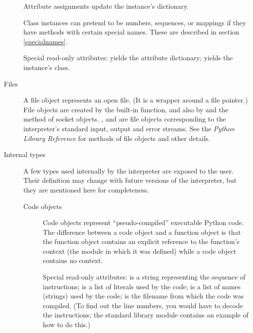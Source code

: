 \begin{description}
Attribute assignments update the instance's dictionary.

Class instances can pretend to be numbers, sequences, or mappings if
they have methods with certain special names.  These are described in
section \ref{specialnames}.

Special read-only attributes:  yields the attribute
dictionary;  yields the instance's class.

\item[Files]
A file object represents an open file.  (It is a wrapper around a \C{}
 file pointer.)  File objects are created by the
 built-in function, and also by  and
the  method of socket objects.  ,
 and  are file objects corresponding
to the interpreter's standard input, output and error streams.
See the \emph{Python Library Reference} for methods of file objects
and other details.

\item[Internal types]
A few types used internally by the interpreter are exposed to the user.
Their definition may change with future versions of the interpreter,
but they are mentioned here for completeness.

\begin{description}

\item[Code objects]
Code objects represent ``pseudo-compiled'' executable Python code.
The difference between a code
object and a function object is that the function object contains an
explicit reference to the function's context (the module in which it
was defined) while a code object contains no context.

Special read-only attributes:  is a string representing
the sequence of instructions;  is a list of literals
used by the code;  is a list of names (strings) used by
the code;  is the filename from which the code was
compiled.  (To find out the line numbers, you would have to decode the
instructions; the standard library module
 contains an example of how to do
this.)


\end{description}
\end{description}
